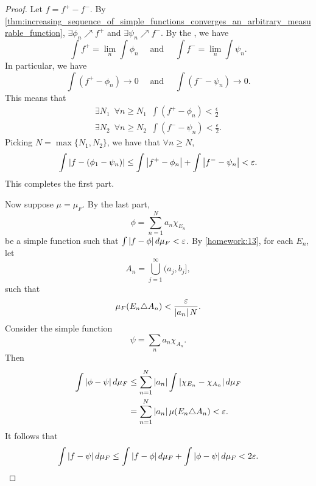 \documentclass[notoc,notitlepage]{tufte-book}
\begin{document}
\begin{proof}
  Let $f = f^+ - f^-$.
  By
  \cref{thm:increasing_sequence_of_simple_functions_converges_an_arbitrary_measurable_function},
  $\exists \phi_n \nearrow f^+$ and $\exists \psi_n \nearrow f^-$.
  By the ,
  we have
  \begin{equation*}
    \int f^+ = \lim_n \int \phi_n \quad\text{ and }\quad
    \int f^- = \lim_n \int \psi_n.
  \end{equation*}
  In particular, we have
  \begin{equation*}
    \int (f^+ - \phi_n) \to 0 \quad\text{ and }\quad
    \int (f^- - \psi_n) \to 0.
  \end{equation*}
  This means that
  \begin{gather*}
    \exists N_1\enspace \forall n \geq N_1\enspace
    \int (f^+ - \phi_n) < \frac{\epsilon}{2} \\
    \exists N_2\enspace \forall n \geq N_2\enspace
    \int (f^- - \psi_n) < \frac{\epsilon}{2}.
  \end{gather*}
  Picking $N = \max \{ N_1, N_2 \}$, we have that $\forall n \geq N$,
  \begin{equation*}
    \int \left|f - (\phi_1 - \psi_n)\right|
    \leq \int \left|f^+ - \phi_n\right| + \int \left|f^- - \psi_n\right|
    < \varepsilon.
  \end{equation*}
  This completes the first part.

  Now suppose $\mu = \mu_F$. By the last part,
  \begin{equation*}
    \phi = \sum_{n=1}^{N} a_n \chi_{E_n}
  \end{equation*}
  be a simple function such that $\int \left|f - \phi\right| \mathop{}\!d{\mu_F} < \varepsilon$.
  By \cref{homework:13}, for each $E_n$, let
  \begin{equation*}
    A_n = \bigcup_{j=1}^{\infty} (a_j, b_j],
  \end{equation*}
  such that
  \begin{equation*}
    \mu_F(E_n \triangle A_n) < \frac{\varepsilon}{\left|a_n\right| N}.
  \end{equation*}
  Consider the simple function
  \begin{equation*}
    \psi = \sum_{n} a_n \chi_{A_n}.
  \end{equation*}
  Then
  \begin{align*}
    \int \left|\phi - \psi\right| \mathop{}\!d{\mu_F}
    &\leq \sum_{n=1}^{N} \left|a_n\right| \int \left| \chi_{E_n} - \chi_{A_n} \right| \mathop{}\!d{\mu_F} \\
    &= \sum_{n=1}^{N} \left|a_n\right| \mu(E_n \triangle A_n) < \varepsilon.
  \end{align*}
  It follows that
  \begin{equation*}
    \int \left|f - \psi\right| \mathop{}\!d{\mu_F}
    \leq \int \left|f - \phi\right| \mathop{}\!d{\mu_F} + \int \left|\phi - \psi\right| \mathop{}\!d{\mu_F}
    < 2 \varepsilon.
  \end{equation*}


\end{proof}
\end{document}
